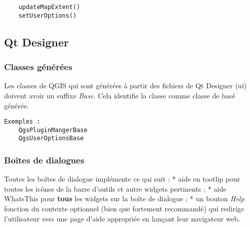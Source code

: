 \begin{verbatim}
	updateMapExtent()
	setUserOptions()
\end{verbatim}

\subsection{Qt Designer}
\subsubsection{Classes générées}
Les classes de QGIS qui sont générées à partir des fichiers de Qt Designer (ui) doivent avoir un suffixe \textit{Base}. Cela identifie la classe comme classe de basé générée.

\begin{verbatim}
Exemples :
	QgsPluginMangerBase
	QgsUserOptionsBase
\end{verbatim}
\subsubsection{Boîtes de dialogues}
Toutes les boîtes de dialogue implémente ce qui suit :
 * aide en tootlip pour toutes les icônes de la barre d'outils et autre widgets pertinents ;
  * aide WhatsThis pour \textbf{tous} les widgets sur la boîte de dialogue ;
  * un bouton \textit{Help} fonction du contexte optionnel (bien que fortement recommandé) qui redirige l'utilisateur vers une page d'aide appropriée en lançant leur navigateur web.

